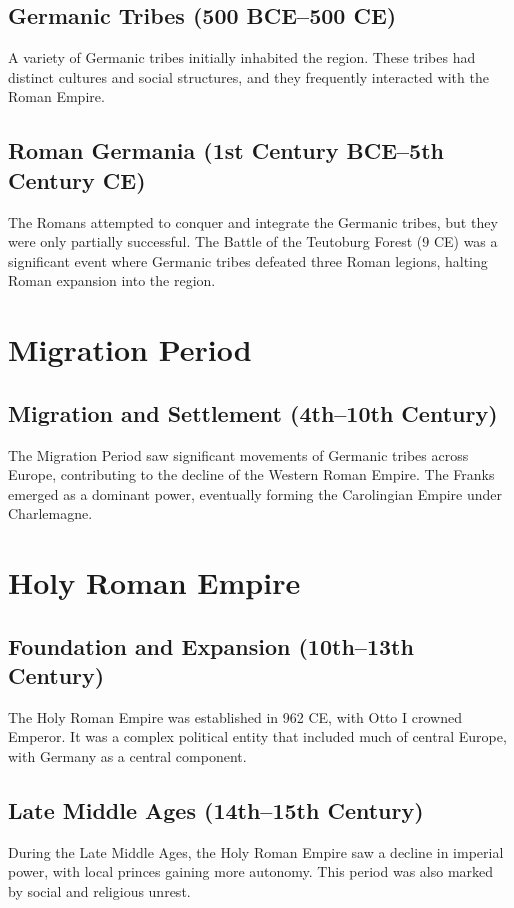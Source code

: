 \documentclass{book}
\begin{document}
\subsection{Germanic Tribes (500 BCE–500 CE)}
A variety of Germanic tribes initially inhabited the region. These tribes had distinct cultures and social structures, and they frequently interacted with the Roman Empire.

\subsection{Roman Germania (1st Century BCE–5th Century CE)}
The Romans attempted to conquer and integrate the Germanic tribes, but they were only partially successful. The Battle of the Teutoburg Forest (9 CE) was a significant event where Germanic tribes defeated three Roman legions, halting Roman expansion into the region.

\section{Migration Period}
\label{sec:migration-period}
\subsection{Migration and Settlement (4th–10th Century)}
The Migration Period saw significant movements of Germanic tribes across Europe, contributing to the decline of the Western Roman Empire. The Franks emerged as a dominant power, eventually forming the Carolingian Empire under Charlemagne.

\section{Holy Roman Empire}
\label{sec:holy-roman-empire}
\subsection{Foundation and Expansion (10th–13th Century)}
The Holy Roman Empire was established in 962 CE, with Otto I crowned Emperor. It was a complex political entity that included much of central Europe, with Germany as a central component.

\subsection{Late Middle Ages (14th–15th Century)}
During the Late Middle Ages, the Holy Roman Empire saw a decline in imperial power, with local princes gaining more autonomy. This period was also marked by social and religious unrest.
\end{document}
